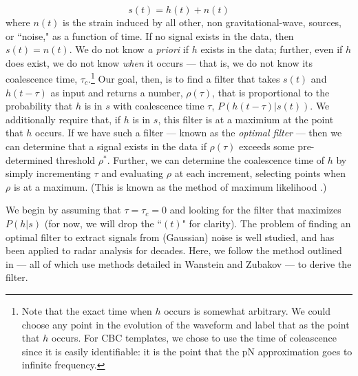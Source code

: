 \begin{equation}
\label{eqn:ifo_data}
s(t) = h(t) + n(t)
\end{equation}
where $n(t)$ is the strain induced by all other, non gravitational-wave,  sources, or ``noise," as a function of time. If no signal exists in the data, then $s(t) = n(t)$. We do not know \emph{a priori} if $h$ exists in the data; further, even if $h$ does exist, we do not know \emph{when} it occurs --- that is, we do not know its coalescence time, $\tau_c$.\footnote{Note that the exact time when $h$ occurs is somewhat arbitrary. We could choose any point in the evolution of the waveform and label that as the point that $h$ occurs. For \ac{CBC} templates, we chose to use the time of coleascence since it is easily identifiable: it is the point that the \ac{pN} approximation goes to infinite frequency.} Our goal, then, is to find a filter that takes $s(t)$ and $h(t-\tau)$ as input and returns a number, $\rho(\tau)$, that is proportional to the probability that $h$ is in $s$ with coalescence time $\tau$, $P(h(t-\tau)|s(t))$. We additionally require that, if $h$ is in $s$, this filter is at a maximium at the point that $h$ occurs. If we have such a filter --- known as the \emph{optimal filter} --- then we can determine that a signal exists in the data if $\rho(\tau)$ exceeds some pre-determined threshold $\rho^{*}$. Further, we can determine the coalescence time of $h$ by simply incrementing $\tau$ and evaluating $\rho$ at each increment, selecting points when $\rho$ is at a maximum. (This is known as the method of maximum likelihood \cite{ref:Brown}.)

We begin by assuming that $\tau = \tau_c = 0$ and looking for the filter that maximizes $P(h|s)$ (for now, we will drop the ``$(t)$" for clarity). The problem of finding an optimal filter to extract signals from (Gaussian) noise is well studied, and has been applied to radar analysis for decades. Here, we follow the method outlined in \cite{ref:Finn,ref:Finn_Chernoff,ref:Brown} --- all of which use methods detailed in Wanstein and Zubakov \cite{ref:Wanstein_Zubakov} --- to derive the filter.

